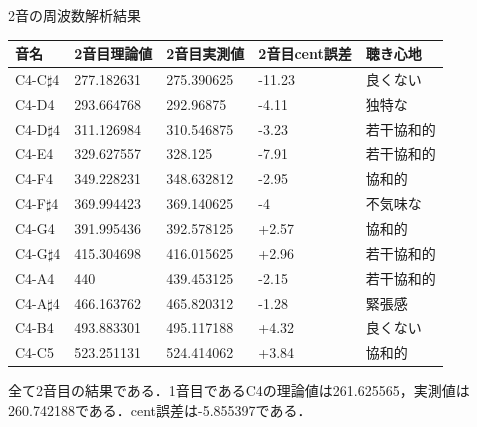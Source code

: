 \documentclass[dvipdfmx,uplatex]{beamer}
\begin{document}
\begin{frame}{2音の周波数解析結果}

\begin{table}[!ht]
    \centering
    \begin{tabular}{|l|l|l|l|l|}
    \hline
        音名 & 2音目理論値 & 2音目実測値 & 2音目cent誤差 & 聴き心地 \\ \hline
        C4-C$\sharp$4 & 277.182631 & 275.390625 & -11.23 & 良くない \\ \hline
        C4-D4 & 293.664768 & 292.96875 & -4.11 & 独特な \\ \hline
        C4-D$\sharp$4 & 311.126984 & 310.546875 & -3.23 & 若干協和的 \\ \hline
        C4-E4 & 329.627557 & 328.125 & -7.91 & 若干協和的 \\ \hline
        C4-F4 & 349.228231 & 348.632812 & -2.95 & 協和的 \\ \hline
        C4-F$\sharp$4 & 369.994423 & 369.140625 & -4 & 不気味な \\ \hline
        C4-G4 & 391.995436 & 392.578125 & +2.57 & 協和的 \\ \hline
        C4-G$\sharp$4 & 415.304698 & 416.015625 & +2.96 & 若干協和的 \\ \hline
        C4-A4 & 440 & 439.453125 & -2.15 & 若干協和的 \\ \hline
        C4-A$\sharp$4 & 466.163762 & 465.820312 & -1.28 & 緊張感 \\ \hline
        C4-B4 & 493.883301 & 495.117188 & +4.32 & 良くない \\ \hline
        C4-C5 & 523.251131 & 524.414062 & +3.84 & 協和的 \\ \hline
    \end{tabular}
\end{table}

全て2音目の結果である．1音目であるC4の理論値は261.625565，実測値は260.742188である．cent誤差は-5.855397である．

\end{frame}
\end{document}
